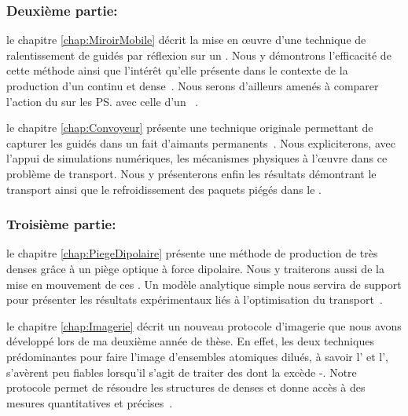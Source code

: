 \subsubsection{Deuxième partie: \TitrePartieDeux}
\begin{ditemize}
%
	\item le chapitre \ref{chap:MiroirMobile} décrit la mise en \oe uvre d'une technique de ralentissement de \pats guidés par réflexion sur un \mimamo. Nous y démontrons l'efficacité de cette méthode ainsi que l'intérêt qu'elle présente dans le contexte de la production d'un \jatuf continu et dense~\cite{RLC06}. Nous serons d'ailleurs amenés à comparer l'action du \mimo sur les \ps avec celle d'un ~\cite{ReG08}.
%
	\item le chapitre \ref{chap:Convoyeur} présente une technique originale permettant de capturer les \pats guidés dans un \tpm \tds fait d'aimants permanents~\cite{LRW06}. Nous expliciterons, avec l'appui de simulations numériques, les mécanismes physiques à l'\oe uvre dans ce problème de transport. 
Nous y présenterons enfin les résultats démontrant le transport ainsi que le refroidissement des paquets piégés dans le \tpm.

%
\end{ditemize}
 
 
\subsubsection{Troisième partie: \TitrePartieTrois}
\begin{ditemize}
%
	\item le chapitre \ref{chap:PiegeDipolaire} présente une méthode de production de \pats très denses grâce à un piège optique à force dipolaire. Nous y traiterons aussi de la mise en mouvement de ces \ns. Un modèle analytique simple nous servira de support pour présenter les résultats expérimentaux liés à l'optimisation du transport~\cite{CKR08}.
%
	\item le chapitre \ref{chap:Imagerie} décrit un nouveau protocole d'imagerie que nous avons développé lors de ma deuxième année de thèse. En effet, les deux techniques prédominantes pour faire l'image d'ensembles atomiques dilués, à savoir l' et l', s'avèrent peu fiables lorsqu'il s'agit de traiter des \ns dont la \pro excède -.
Notre protocole permet de résoudre les structures de \nats denses et donne accès à des mesures quantitatives et précises~\cite{RLW07}. 
%
\end{ditemize}
 


